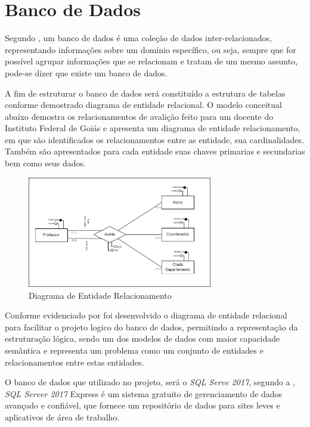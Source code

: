 \section{Banco de Dados}
    Segundo , um banco de dados é uma coleção de dados inter-relacionados, representando informações sobre um domínio específico, ou seja, sempre que for possível agrupar informações que se relacionam e tratam de um mesmo assunto, pode-se dizer que existe um banco de dados.
    
    A fim de estruturar o banco de dados será constituído a estrutura de tabelas conforme demostrado diagrama de entidade relacional. O modelo conceitual abaixo demostra os relacionamentos de avalição feito para um docente do Instituto Federal de Goiás e apresenta um diagrama de entidade relacionamento, em que são identificados os relacionamentos entre as entidade, sua cardinalidades. Também são apresentados para cada entidade suas chaves primarias e secundarias bem como seus dados.
    
    \begin{figure}[h]
    \centering
    \includegraphics[width=0.72\textwidth]{./img/ModeloEntidadeRelacionamento.png}
    \caption{Diagrama de Entidade Relacionamento}
    \label{fig:ModeloEntidadeRelacionamento}
    \end{figure}

    Conforme evidenciado por  foi desenvolvido o diagrama de entidade relacional para facilitar o projeto logico do banco de dados, permitindo a representação da estruturação lógica, sendo um dos modelos de dados com maior capacidade semântica e representa um problema como um conjunto de entidades e relacionamentos entre estas entidades.

    O banco de dados que utilizado no projeto, será o \textit{SQL Serve 2017}, segundo a ,  \textit{SQL Server 2017} Express é um sistema gratuito de gerenciamento de dados avançado e confiável, que fornece um repositório de dados para sites leves e aplicativos de área de trabalho. 


